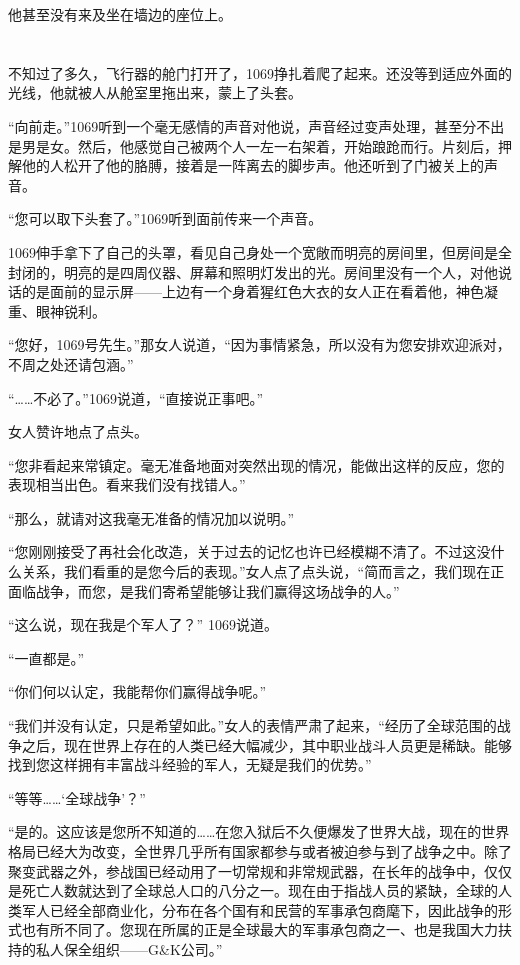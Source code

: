 他甚至没有来及坐在墙边的座位上。
\section*{}

不知过了多久，飞行器的舱门打开了，1069挣扎着爬了起来。还没等到适应外面的光线，他就被人从舱室里拖出来，蒙上了头套。

“向前走。”1069听到一个毫无感情的声音对他说，声音经过变声处理，甚至分不出是男是女。然后，他感觉自己被两个人一左一右架着，开始踉跄而行。片刻后，押解他的人松开了他的胳膊，接着是一阵离去的脚步声。他还听到了门被关上的声音。

“您可以取下头套了。”1069听到面前传来一个声音。

1069伸手拿下了自己的头罩，看见自己身处一个宽敞而明亮的房间里，但房间是全封闭的，明亮的是四周仪器、屏幕和照明灯发出的光。房间里没有一个人，对他说话的是面前的显示屏——上边有一个身着猩红色大衣的女人正在看着他，神色凝重、眼神锐利。

“您好，1069号先生。”那女人说道，“因为事情紧急，所以没有为您安排欢迎派对，不周之处还请包涵。”

“……不必了。”1069说道，“直接说正事吧。”

女人赞许地点了点头。

“您非看起来常镇定。毫无准备地面对突然出现的情况，能做出这样的反应，您的表现相当出色。看来我们没有找错人。”

“那么，就请对这我毫无准备的情况加以说明。”

“您刚刚接受了再社会化改造，关于过去的记忆也许已经模糊不清了。不过这没什么关系，我们看重的是您今后的表现。”女人点了点头说，“简而言之，我们现在正面临战争，而您，是我们寄希望能够让我们赢得这场战争的人。”

“这么说，现在我是个军人了？” 1069说道。

“一直都是。”

“你们何以认定，我能帮你们赢得战争呢。”

“我们并没有认定，只是希望如此。”女人的表情严肃了起来，“经历了全球范围的战争之后，现在世界上存在的人类已经大幅减少，其中职业战斗人员更是稀缺。能够找到您这样拥有丰富战斗经验的军人，无疑是我们的优势。”

“等等……‘全球战争’？”

“是的。这应该是您所不知道的……在您入狱后不久便爆发了世界大战，现在的世界格局已经大为改变，全世界几乎所有国家都参与或者被迫参与到了战争之中。除了聚变武器之外，参战国已经动用了一切常规和非常规武器，在长年的战争中，仅仅是死亡人数就达到了全球总人口的八分之一。现在由于指战人员的紧缺，全球的人类军人已经全部商业化，分布在各个国有和民营的军事承包商麾下，因此战争的形式也有所不同了。您现在所属的正是全球最大的军事承包商之一、也是我国大力扶持的私人保全组织——G\&K公司。”

